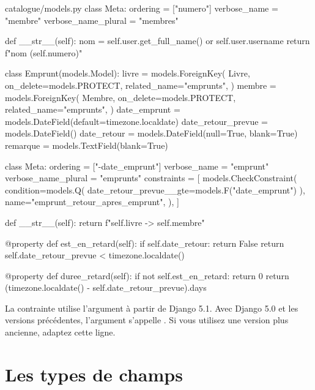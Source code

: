\begin{codebox}[python]{catalogue/models.py}
    class Meta:
        ordering = ["numero"]
        verbose_name = "membre"
        verbose_name_plural = "membres"

    def __str__(self):
        nom = self.user.get_full_name() or self.user.username
        return f"{nom} ({self.numero})"


class Emprunt(models.Model):
    livre = models.ForeignKey(
        Livre,
        on_delete=models.PROTECT,
        related_name="emprunts",
    )
    membre = models.ForeignKey(
        Membre,
        on_delete=models.PROTECT,
        related_name="emprunts",
    )
    date_emprunt = models.DateField(default=timezone.localdate)
    date_retour_prevue = models.DateField()
    date_retour = models.DateField(null=True, blank=True)
    remarque = models.TextField(blank=True)

    class Meta:
        ordering = ["-date_emprunt"]
        verbose_name = "emprunt"
        verbose_name_plural = "emprunts"
        constraints = [
            models.CheckConstraint(
                condition=models.Q(
                    date_retour_prevue__gte=models.F("date_emprunt")
                ),
                name="emprunt_retour_apres_emprunt",
            ),
        ]

    def __str__(self):
        return f"{self.livre} -> {self.membre}"

    @property
    def est_en_retard(self):
        if self.date_retour:
            return False
        return self.date_retour_prevue < timezone.localdate()

    @property
    def duree_retard(self):
        if not self.est_en_retard:
            return 0
        return (timezone.localdate() - self.date_retour_prevue).days
\end{codebox}

\begin{attention}
La contrainte  utilise l'argument  à partir
de Django 5.1. Avec Django 5.0 et les versions précédentes, l'argument s'appelle
. Si vous utilisez une version plus ancienne, adaptez cette ligne.
\end{attention}

\section{Les types de champs}

